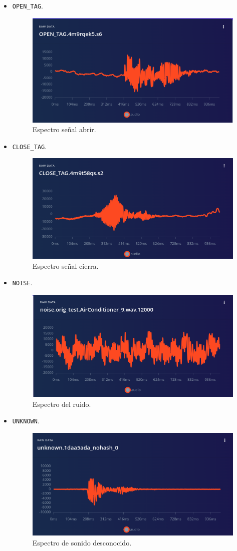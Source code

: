\begin{itemize}
\item \texttt{OPEN\_TAG}.
    \begin{figure}[H]
    \centering
    \includegraphics[width=.4\linewidth]{Img/open_tag.png}
    \caption{Espectro señal abrir.}
    \label{open_tag}
    \end{figure}
\item \texttt{CLOSE\_TAG}.
     \begin{figure}[H]
    \centering
    \includegraphics[width=.4\linewidth]{Img/close_tag.png}
    \caption{Espectro señal cierra.}
    \label{close_tag}
    \end{figure}
\item \texttt{NOISE}.
    \begin{figure}[H]
    \centering
    \includegraphics[width=.55\linewidth]{Img/noise.png}
    \caption{Espectro del ruido.}
    \label{noise}
    \end{figure}
\item \texttt{UNKNOWN}.
    \begin{figure}[H]
    \centering
    \includegraphics[width=.55\linewidth]{Img/unknown.png}
    \caption{Espectro de sonido desconocido.}
    \label{unk}
    \end{figure}
\end{itemize}
